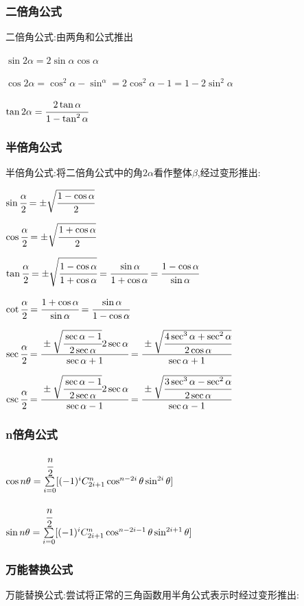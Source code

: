 \documentclass[UTF8,12pt]{ctexbook}
\newcommand{\mathCombination}[2]{C_{#1}^{#2}}
\newcommand{\upDownSum}[2]{\sum\limits_{#2}^{#1}}
\begin{document}
{{{  \subsubsection{二倍角公式}{
    二倍角公式:由两角和公式推出

    $\sin2\alpha = 2\sin\alpha\cos\alpha$

    $\cos2\alpha = \cos^2\alpha - \sin^\alpha = 2\cos^2\alpha - 1 = 1 - 2\sin^2\alpha$

    $\tan2\alpha = \cfrac{2\tan\alpha}{1 - \tan^2\alpha}$
  }%

  \subsubsection{半倍角公式}{
    半倍角公式:将二倍角公式中的角$2\alpha$看作整体$\beta$,经过变形推出:

    $\sin\cfrac{\alpha}{2} = \pm\sqrt{\cfrac{1 - \cos\alpha}{2}}$

    $\cos\cfrac{\alpha}{2} = \pm\sqrt{\cfrac{1 + \cos\alpha}{2}}$

    $\tan\cfrac{\alpha}{2} = \pm\sqrt{\cfrac{1-\cos\alpha}{1+\cos\alpha}} = \cfrac{\sin\alpha}{1+\cos\alpha} = \cfrac{1-\cos\alpha}{\sin\alpha}$

    $\cot\cfrac{\alpha}{2} = \cfrac{1+\cos\alpha}{\sin\alpha} = \cfrac{\sin\alpha}{1-\cos\alpha}$

    $\sec\cfrac{\alpha}{2} = \cfrac{\pm\sqrt{\cfrac{\sec\alpha - 1}{2\sec\alpha}}2\sec\alpha}{\sec\alpha + 1} = \cfrac{\pm\sqrt{\cfrac{4\sec^3\alpha + \sec^2\alpha}{2\cos\alpha}}}{\sec\alpha + 1}$

    $\csc\cfrac{\alpha}{2} = \cfrac{\pm\sqrt{\cfrac{\sec\alpha - 1}{2\sec\alpha}}2\sec\alpha}{\sec\alpha - 1} = \cfrac{\pm\sqrt{\cfrac{3\sec^3\alpha - \sec^2\alpha}{2\sec\alpha}}}{\sec\alpha - 1}$
  }%

  \subsubsection{n倍角公式}{
    $\cos{n\theta} = \upDownSum{\cfrac{n}{2}}{i = 0}[(-1)^i\mathCombination{2i + 1}{n}\cos^{n - 2i}\theta\sin^{2i}\theta]$

    $\sin{n\theta} = \upDownSum{\cfrac{n}{2}}{i = 0}[(-1)^i\mathCombination{2i + 1}{n}\cos^{n - 2i - 1}\theta\sin^{2i+1}\theta]$
  }%

  \subsubsection{万能替换公式}{
    万能替换公式:尝试将正常的三角函数用半角公式表示时经过变形推出:

}}}}
\end{document}
